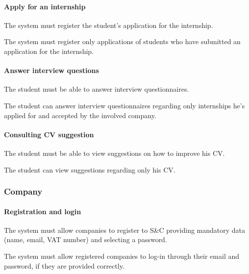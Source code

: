\paragraph{Apply for an internship}
\begin{requirements}[resume]
\item The system must register the student's application for the internship.
\item The system must register only applications of students who have submitted an application for the internship.
\end{requirements}
\paragraph{Answer interview questions}
\begin{requirements}[resume]
\item The student must be able to answer interview questionnaires.
\item The student can answer interview questionnaires regarding only internships he’s applied for and accepted by the involved company.
\end{requirements}
\paragraph{Consulting CV suggestion}
\begin{requirements}[resume]
\item The student must be able to view suggestions on how to improve his CV.
\item The student can view suggestions regarding only his CV.
\end{requirements}
\subsubsection{Company}
\paragraph{Registration and login}
\begin{requirements}[resume]
\item The system must allow companies to register to S\&C providing mandatory data (name, email, VAT number) and selecting a password.
\item The system must allow registered companies to log-in through their email and password, if they are provided correctly. 
\end{requirements}
